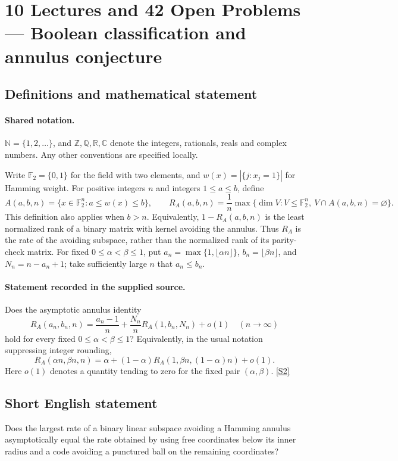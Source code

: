 \documentclass[11pt]{article}
\newcommand{\sref}[2]{\hyperlink{source:#1:#2}{[S#2]}}
\begin{document}
\section{10 Lectures and 42 Open Problems — Boolean classification and annulus conjecture}\label{statement}

\subsection{Definitions and mathematical statement}

\paragraph{Shared notation.}$\mathbb N=\{1,2,\ldots\}$, and $\mathbb Z,\mathbb Q,\mathbb R,\mathbb C$ denote the integers, rationals, reals and complex numbers. Any other conventions are specified locally.


Write \(\mathbb F_2=\{0,1\}\) for the field with two elements, and \(w(x)=|\{j:x_j=1\}|\) for Hamming weight. For positive integers \(n\) and integers \(1\le a\le b\), define
\[A(a,b,n)=\{x\in\mathbb F_2^n:a\le w(x)\le b\},\qquad
R_A(a,b,n)=\frac1n\max\{\dim V:V\le\mathbb F_2^n,\ V\cap A(a,b,n)=\varnothing\}.\]
This definition also applies when \(b>n\). Equivalently, \(1-R_A(a,b,n)\) is the least normalized rank of a binary matrix with kernel avoiding the annulus. Thus \(R_A\) is the rate of the avoiding subspace, rather than the normalized rank of its parity-check matrix.
For fixed \(0\le\alpha<\beta\le1\), put \(a_n=\max\{1,\lfloor\alpha n\rfloor\}\), \(b_n=\lfloor\beta n\rfloor\), and \(N_n=n-a_n+1\); take sufficiently large \(n\) that \(a_n\le b_n\).
\paragraph{Statement recorded in the supplied source.}
Does the asymptotic annulus identity
\[R_A(a_n,b_n,n)=\frac{a_n-1}{n}+\frac{N_n}{n}R_A(1,b_n,N_n)+o(1)\quad(n\to\infty)\]
hold for every fixed \(0\le\alpha<\beta\le1\)? Equivalently, in the usual notation suppressing integer rounding,
\[R_A(\alpha n,\beta n,n)=\alpha+(1-\alpha)R_A(1,\beta n,(1-\alpha)n)+o(1).\]
Here \(o(1)\) denotes a quantity tending to zero for the fixed pair \((\alpha,\beta)\). \sref{statement}{2}
\subsection{Short English statement}
Does the largest rate of a binary linear subspace avoiding a Hamming annulus asymptotically equal the rate obtained by using free coordinates below its inner radius and a code avoiding a punctured ball on the remaining coordinates?
\end{document}
